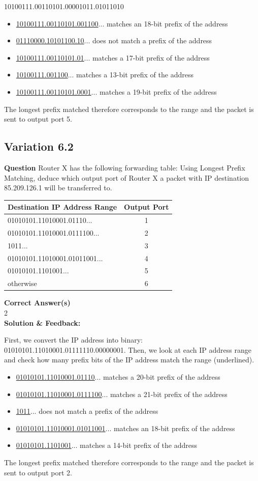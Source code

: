 10100111.00110101.00001011.01011010
\begin{itemize}
    \item \underline{10100111.00110101.001100}... matches an 18-bit prefix of the address
    \item \underline{01110000.10101100.10}... does not match a prefix of the address
    \item \underline{10100111.00110101.01}... matches a 17-bit prefix of the address
    \item \underline{10100111.001100}... matches a 13-bit prefix of the address
    \item \underline{10100111.00110101.0001}... matches a 19-bit prefix of the address
\end{itemize}
The longest prefix matched therefore corresponds to the range and the packet is sent to output port 5.

\subsection{Variation 6.2}

\textbf{Question} Router X has the following forwarding table:
Using Longest Prefix Matching, deduce which output port of Router X a packet with IP destination 85.209.126.1 will be transferred to. \\
\begin{tabular}{|l|c|}
    \hline
    \textbf{Destination IP Address Range} & \textbf{Output Port} \\
    \hline
    01010101.11010001.01110... & 1\\
    \hline
    01010101.11010001.0111100... & 2\\
    \hline
    1011... & 3\\
    \hline
    01010101.11010001.01011001... & 4\\
    \hline
    01010101.1101001... & 5\\
    \hline
    otherwise & 6\\
    \hline
\end{tabular}
\textbf{Correct Answer(s)} \\
2 \\
\textbf{Solution \& Feedback:}

First, we convert the IP address into binary: 01010101.11010001.01111110.00000001.
Then, we look at each IP address range and check how many prefix bits of the IP address match the range (underlined).
\begin{itemize}
    \item \underline{01010101.11010001.01110}... matches a 20-bit prefix of the address
    \item \underline{01010101.11010001.0111100}... matches a 21-bit prefix of the address
    \item \underline{1011}... does not match a prefix of the address
    \item \underline{01010101.11010001.01011001}... matches an 18-bit prefix of the address
    \item \underline{01010101.1101001}... matches a 14-bit prefix of the address
\end{itemize}
The longest prefix matched therefore corresponds to the range and the packet is sent to output port 2.

